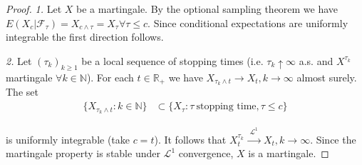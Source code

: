 \documentclass[12pt]{article}
\theoremstyle{definition}
\theoremstyle{plain}
\begin{document}
\begin{proof}
\emph{1.} Let $X$ be a martingale. By the optional sampling theorem we have $E(X_c|\mathcal{F}_{\tau}) = X_{c \wedge \tau} = X_{\tau} \forall \tau \leq c$. Since conditional expectations are uniformly integrable the first direction follows.

\emph{2.} Let $(\tau_k)_{k \geq 1}$ be a local sequence of stopping times (i.e. $\tau_k \uparrow \infty$ a.s. and $X^{\tau_k}$ martingale $\forall k \in \mathbb{N}$).
For each $t \in \mathbb{R}_{+}$ we have $X_{\tau_k \wedge t} \to X_t, k \to \infty$ almost surely.
The set
\begin{align*}
\{X_{\tau_k \wedge t} : k \in \mathbb{N}\} &\subset \{X_{\tau} : \tau \ \text{stopping time}, \tau \leq c\}
\end{align*}

is uniformly integrable (take $c = t$). It follows that $X_t^{\tau_k} \stackrel{\substack{\mathscr{L}^1}}{\longrightarrow} X_t, k \to \infty$. Since the martingale property is stable under $\mathscr{L}^1$ convergence, $X$ is a martingale. 
\end{proof}

\end{document}
